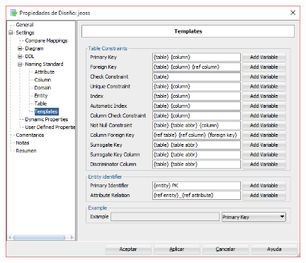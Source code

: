 \documentclass[a4paper,openright,12pt]{book}
\begin{document}
\begin{center}
\includegraphics[width=11cm]{./images/5-2 Ejercicio 2/3.png}\\
\end{center}
\end{document}
